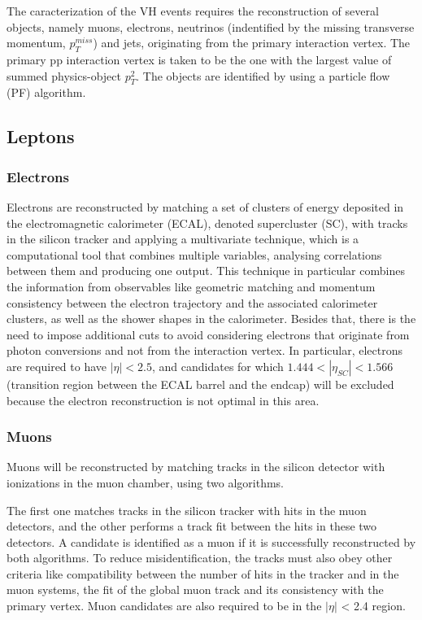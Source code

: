 \documentclass[EPJ,twocolumn]{webofc}
\begin{document}
The caracterization of the VH events requires the reconstruction of several objects, namely muons, electrons, neutrinos (indentified by the missing transverse momentum, $p_{T}^{miss}$) and jets, originating from the primary interaction vertex. The primary pp interaction vertex is taken to be the one with the largest value of summed physics-object $p_{T}^2$.
The objects are identified by using a particle flow (PF) algorithm.

\subsection{Leptons}

\subsubsection*{Electrons}
Electrons are reconstructed by matching a set of clusters of energy deposited in the electromagnetic calorimeter (ECAL), denoted supercluster (SC), with tracks in the silicon tracker and applying a multivariate technique, which is a computational tool that combines multiple variables, analysing correlations between them and producing one output. This technique in particular combines the information from observables like geometric matching and momentum consistency between the electron trajectory and the associated calorimeter clusters, as well as the shower shapes in the calorimeter. Besides that, there is the need to impose additional cuts to avoid considering electrons that originate from photon conversions and not from the interaction vertex. In particular, electrons are required to have $|{\eta}| < 2.5$, and candidates for which $1.444 < |\eta_{SC}| < 1.566$ (transition region between the ECAL barrel and the endcap) will be excluded because the electron reconstruction is not optimal in this area.

\subsubsection*{Muons}

Muons will be reconstructed by matching tracks in the silicon detector with ionizations in the muon chamber, using two algorithms.

The first one matches tracks in the silicon tracker with hits in the muon detectors, and the other performs a track fit between the hits in these two detectors. A candidate is identified as a muon if it is successfully reconstructed by both algorithms. To reduce misidentification, the tracks must also obey other criteria like compatibility between the number of hits in the tracker and in the muon systems, the fit of the global muon track and its consistency with the primary vertex. Muon candidates are also required to be in the $|\eta|$ < 2.4 region.
\end{document}
